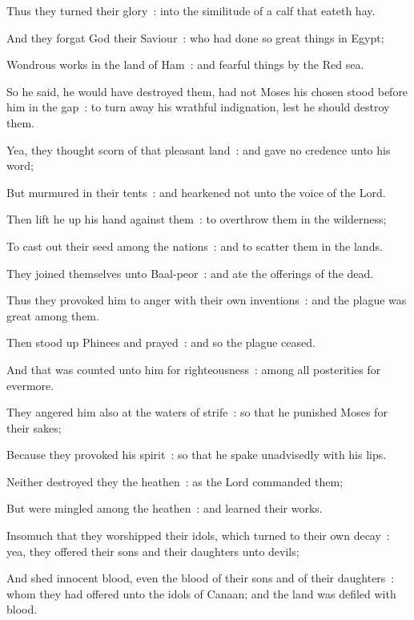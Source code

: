 Thus they turned their glory~: into the similitude of a calf that eateth hay.\par
{}And they forgat God their Saviour~: who had done so great things in Egypt;\par
{}Wondrous works in the land of Ham~: and fearful things by the Red sea.\par
{}So he said, he would have destroyed them, had not Moses his chosen stood before him in the gap~: to turn away his wrathful indignation, lest he should destroy them.\par
{}Yea, they thought scorn of that pleasant land~: and gave no credence unto his word;\par
{}But murmured in their tents~: and hearkened not unto the voice of the Lord.\par
{}Then lift he up his hand against them~: to overthrow them in the wilderness;\par
{}To cast out their seed among the nations~: and to scatter them in the lands.\par
{}They joined themselves unto Baal-peor~: and ate the offerings of the dead.\par
{}Thus they provoked him to anger with their own inventions~: and the plague was great among them.\par
{}Then stood up Phinees and prayed~: and so the plague ceased.\par
{}And that was counted unto him for righteousness~: among all posterities for evermore.\par
{}They angered him also at the waters of strife~: so that he punished Moses for their sakes;\par
{}Because they provoked his spirit~: so that he spake unadvisedly with his lips.\par
{}Neither destroyed they the heathen~: as the Lord commanded them;\par
{}But were mingled among the heathen~: and learned their works.\par
{}Insomuch that they worshipped their idols, which turned to their own decay~: yea, they offered their sons and their daughters unto devils;\par
{}And shed innocent blood, even the blood of their sons and of their daughters~: whom they had offered unto the idols of Canaan; and the land was defiled with blood.\par
